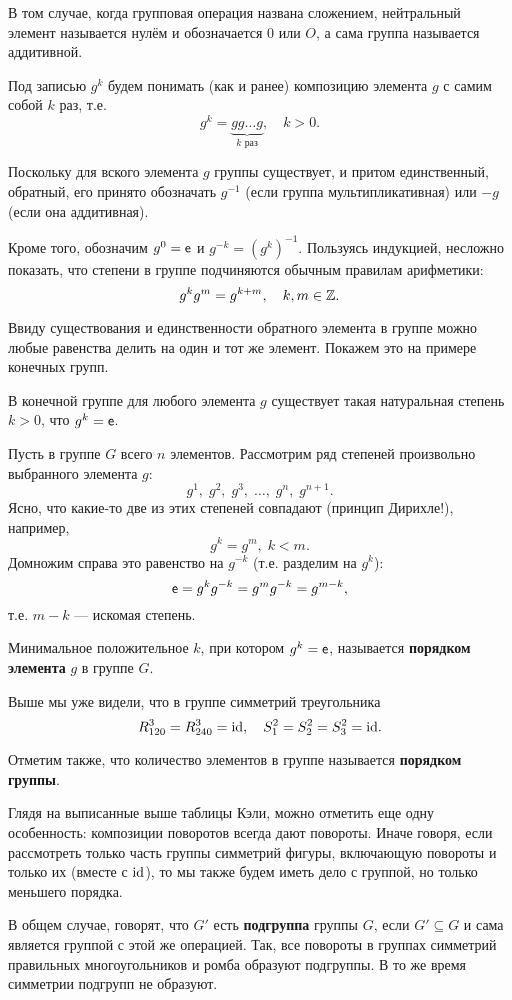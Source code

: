 В том случае, когда групповая операция названа сложением, нейтральный элемент называется нулём и обозначается 0 или $O$, а сама группа называется аддитивной.

Под записью $g^k$ будем понимать (как и ранее) композицию элемента $g$ с самим собой $k$ раз, т.е.
$$
g^k = \underbrace{gg\dots g}_{k\mbox{ раз}},\quad k>0.
$$

Поскольку для вского элемента $g$ группы существует, и притом единственный, обратный, его принято обозначать $g^{-1}$ (если группа мультипликативная) или $-g$ (если она аддитивная).

Кроме того, обозначим $g^0=\mathsf e$ и $g^{-k}=(g^k)^{-1}$. Пользуясь индукцией, несложно показать, что степени в группе подчиняются обычным правилам арифметики:
$$
g^kg^m=g^{k+m}, \quad k,m\in\mathbb Z.
$$


Ввиду существования и единственности обратного элемента в группе можно любые равенства делить на один и тот же элемент. Покажем это на примере конечных групп.
\begin{thrm}
В конечной группе для любого элемента $g$ существует такая натуральная степень $k>0$, что $g^k=\mathsf e$.
\end{thrm}
\pf
Пусть в группе $G$ всего $n$ элементов. Рассмотрим ряд степеней произвольно выбранного элемента $g$:
$$
g^1,\;g^2,\;g^3,\;\dots,\;g^n,\;g^{n+1}.
$$
Ясно, что какие-то две из этих степеней совпадают (принцип Дирихле!), например,
$$
g^k=g^m,\;k<m.
$$
Домножим справа это равенство на $g^{-k}$ (т.е. разделим на $g^k$):
$$
\mathsf e=g^kg^{-k}=g^mg^{-k}=g^{m-k},
$$
т.е. $m-k$ --- искомая степень.
\epf

Минимальное положительное $k$, при котором $g^k=\mathsf e$, называется \textbf{порядком элемента} $g$ в группе $G$.

Выше мы уже видели, что в группе симметрий треугольника
$$
R_{120}^3=R_{240}^3=\mathrm{id},\quad S_1^2=S_2^2=S_3^2=\mathrm{id}.
$$

Отметим также, что количество элементов в группе называется \textbf{порядком группы}.

Глядя на выписанные выше таблицы Кэли, можно отметить еще одну особенность: композиции поворотов всегда дают повороты. Иначе говоря, если рассмотреть только часть группы симметрий фигуры, включающую повороты и только их (вместе с $\mathrm{id}$), то мы также будем иметь дело с группой, но только меньшего порядка.

В общем случае, говорят, что $G'$ есть \textbf{подгруппа} группы $G$, если $G'\subseteq G$ и сама является группой с этой же операцией. Так, все повороты в группах симметрий правильных многоугольников и ромба образуют подгруппы. В то же время симметрии подгрупп не образуют.

